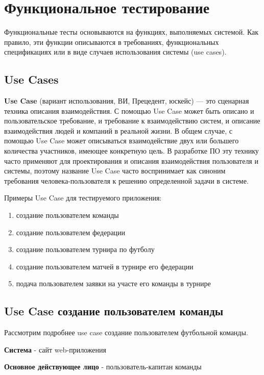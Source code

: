 \section{Функциональное тестирование}

Функциональные тесты основываются на функциях, выполняемых системой. Как правило, эти функции описываются в требованиях, функциональных спецификациях или в виде случаев использования системы (use cases).

\subsection{Use Cases}

\textbf{Use Case} (вариант использования, ВИ, Прецедент, юскейс) — это сценарная техника описания взаимодействия. С помощью Use Case может быть описано и пользовательское требование, и требование к взаимодействию систем, и описание взаимодействия людей и компаний в реальной жизни. В общем случае, с помощью Use Case может описываться взаимодействие двух или большего количества участников, имеющее конкретную цель. В разработке ПО эту технику часто применяют для проектирования и описания взаимодействия пользователя и системы, поэтому название Use Case часто воспринимает как синоним требования человека-пользователя к решению определенной задачи в системе.


Примеры Use Case для тестируемого приложения:
\begin{enumerate}
	\item создание пользователем команды
	\item создание пользователем федерации
	\item создание пользователем турнира по футболу
	\item создание пользователем матчей в турнире его федерации
	\item подача пользователем заявки на участе его команды в турнире 
\end{enumerate}

\subsection{Use Case создание пользователем команды}

Рассмотрим подробнее use case создание пользователем футбольной команды.

\textbf{Система} - сайт web-приложения

\textbf{Основное действующее лицо} - пользователь-капитан команды

